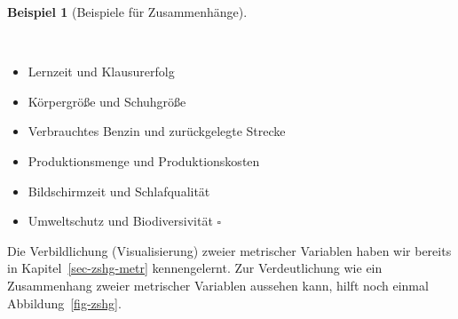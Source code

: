\documentclass[
  letterpaper,
  twoside,
  open=any]{scrbook}
\providecommand{\tightlist}{%
  \setlength{\itemsep}{0pt}\setlength{\parskip}{0pt}}\usepackage{longtable,booktabs,array}
\theoremstyle{definition}
\theoremstyle{definition}
\newtheorem{example}{Beispiel}[chapter]
\theoremstyle{definition}
\theoremstyle{remark}
\begin{document}
\begin{example}[Beispiele für
Zusammenhänge]\protect\hypertarget{exm-zsmn}{}\label{exm-zsmn}

~

\begin{itemize}
\tightlist
\item
  Lernzeit und Klausurerfolg
\item
  Körpergröße und Schuhgröße
\item
  Verbrauchtes Benzin und zurückgelegte Strecke
\item
  Produktionsmenge und Produktionskosten
\item
  Bildschirmzeit und Schlafqualität
\item
  Umweltschutz und Biodiversivität \(\square\)
\end{itemize}

\end{example}

Die Verbildlichung (Visualisierung) zweier metrischer Variablen haben
wir bereits in Kapitel~\ref{sec-zshg-metr} kennengelernt. Zur
Verdeutlichung wie ein Zusammenhang zweier metrischer Variablen aussehen
kann, hilft noch einmal Abbildung~\ref{fig-zshg}.
\end{document}
